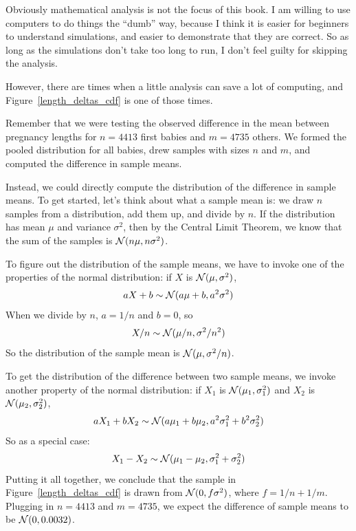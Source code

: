 \documentclass[12pt]{book}
\begin{document}


Obviously mathematical analysis is not the focus of this book.  I am
willing to use computers to do things the ``dumb'' way, because I
think it is easier for beginners to understand simulations, and easier
to demonstrate that they are correct.  So as long as the simulations
don't take too long to run, I don't feel guilty for skipping the
analysis.

However, there are times when a little analysis can save a lot of
computing, and Figure~\ref{length_deltas_cdf} is one of those times.


Remember that we were testing the observed difference in the mean between
pregnancy lengths for $n=4413$ first babies and $m=4735$ others.  We formed
the pooled distribution for all babies, drew samples with sizes $n$ and
$m$, and computed the difference in sample means.


Instead, we could directly compute the distribution of the difference
in sample means.  To get started, let's think about what a sample mean
is: we draw $n$ samples from a distribution, add them up, and
divide by $n$.  If the distribution has mean $\mu$ and variance
$\sigma^2$, then by the Central Limit Theorem, we know that the sum of
the samples is $\mathcal{N} (n \mu, n \sigma^2)$.


To figure out the distribution of the sample means, we have to invoke
one of the properties of the normal distribution: if $X$ is
$\mathcal{N} (\mu, \sigma^2)$,
%
\[ aX + b \sim \mathcal{N} (a \mu + b, a^2 \sigma^2) \]
%
When we divide by $n$, $a=1/n$ and $b=0$, so
%
\[ X/n \sim \mathcal{N} (\mu / n, \sigma^2/ n^2) \]
%
So the distribution of the sample mean is $\mathcal{N} (\mu, \sigma^2/n)$.

To get the distribution of the difference between two sample means,
we invoke another property of the normal distribution: if $X_1$ is
$\mathcal{N} (\mu_1, \sigma_1^2)$ and $X_2$ is
$\mathcal{N} (\mu_2, \sigma_2^2)$,
%
\[ aX_1 + bX_2 \sim \mathcal{N} (a\mu_1 + b\mu_2, 
                                 a^2\sigma_1^2 + b^2\sigma_2^2) \]
%
So as a special case:
%
\[ X_1 - X_2 \sim \mathcal{N} (\mu_1 - \mu_2, 
                               \sigma_1^2 + \sigma_2^2) \]
%
Putting it all together, we conclude that the sample in
Figure~\ref{length_deltas_cdf} is drawn from 
$\mathcal{N} (0, f \sigma^2)$, where $f = 1/n + 1/m$.  Plugging in
$n=4413$ and $m=4735$, we expect the difference of sample means to be
$\mathcal{N} (0, 0.0032)$.
\end{document}
